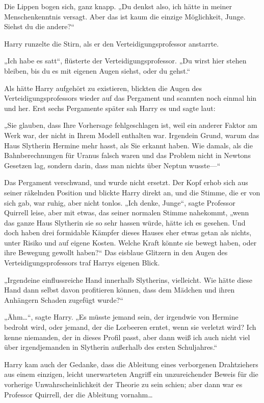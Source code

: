 {Die Lippen bogen sich, ganz knapp. „Du denkst also, ich hätte in meiner Menschenkenntnis versagt. Aber das ist kaum die einzige Möglichkeit, Junge. Siehst du die andere?“

Harry runzelte die Stirn, als er den Verteidigungsprofessor anstarrte.

„Ich habe es satt“, flüsterte der Verteidigungsprofessor. „Du wirst hier stehen bleiben, bis du es mit eigenen Augen siehst, oder du gehst.“

Als hätte Harry aufgehört zu existieren, blickten die Augen des Verteidigungsprofessors wieder auf das Pergament und scannten noch einmal hin und her. Erst sechs Pergamente später sah Harry es und sagte laut:

„Sie glauben, dass Ihre Vorhersage fehlgeschlagen ist, weil ein anderer Faktor am Werk war, der nicht in Ihrem Modell enthalten war. Irgendein Grund, warum das Haus Slytherin Hermine mehr hasst, als Sie erkannt haben. Wie damals, als die Bahnberechnungen für Uranus falsch waren und das Problem nicht in Newtons Gesetzen lag, sondern darin, dass man nichts über Neptun wusste—“

Das Pergament verschwand, und wurde nicht ersetzt. Der Kopf erhob sich aus seiner räkelnden Position und blickte Harry direkt an, und die Stimme, die er von sich gab, war ruhig, aber nicht tonlos. „Ich denke, Junge“, sagte Professor Quirrell leise, aber mit etwas, das seiner normalen Stimme nahekommt, „wenn das ganze Haus Slytherin sie so sehr hassen würde, hätte ich es gesehen. Und doch haben drei formidable Kämpfer dieses Hauses eher etwas getan als nichts, unter Risiko und auf eigene Kosten. Welche Kraft könnte sie bewegt haben, oder ihre Bewegung gewollt haben?“ Das eisblaue Glitzern in den Augen des Verteidigungsprofessors traf Harrys eigenen Blick.

„Irgendeine einflussreiche Hand innerhalb Slytherins, vielleicht. Wie hätte diese Hand dann selbst davon profitieren können, dass dem Mädchen und ihren Anhängern Schaden zugefügt wurde?“

„Ähm…“, sagte Harry. „Es müsste jemand sein, der irgendwie von Hermine bedroht wird, oder jemand, der die Lorbeeren erntet, wenn sie verletzt wird? Ich kenne niemanden, der in dieses Profil passt, aber dann weiß ich auch nicht viel über irgendjemanden in Slytherin außerhalb des ersten Schuljahres.“

Harry kam auch der Gedanke, dass die Ableitung eines verborgenen Drahtziehers aus einem einzigen, leicht unerwarteten Angriff ein unzureichender Beweis für die vorherige Unwahrscheinlichkeit der Theorie zu sein schien; aber dann war es Professor Quirrell, der die Ableitung vornahm…

}
